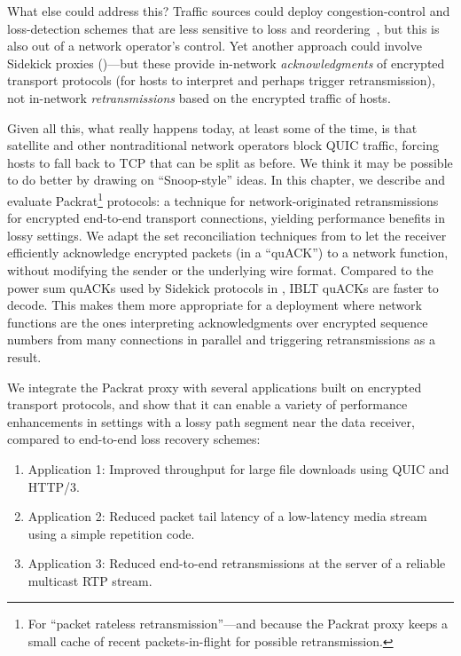 What else could address this? Traffic sources could deploy
congestion-control and loss-detection schemes that are less sensitive
to loss and reordering~\cite{rfc8985}, but this is also out of a
network operator's control. Yet another approach could involve
Sidekick proxies ()---but these provide
in-network \emph{acknowledgments} of encrypted transport protocols
(for hosts to interpret and perhaps trigger retransmission), not
in-network \emph{retransmissions} based on the encrypted traffic of
hosts.

Given all this, what really happens today, at least some
of the time, is that satellite and other nontraditional network
operators block QUIC traffic, forcing hosts to fall back to TCP that
can be split as before. We think it may be possible to do better by drawing on ``Snoop-style''
ideas. In this chapter, we describe and evaluate Packrat\footnote{For
``packet rateless retransmission''---and because the Packrat proxy keeps
a small cache of recent packets-in-flight for possible retransmission.}
protocols: a technique for network-originated retransmissions for encrypted
end-to-end transport connections, yielding performance benefits in lossy
settings. We adapt the set reconciliation techniques from  to
let the receiver efficiently acknowledge encrypted packets (in a ``quACK'') to
a network function, without modifying the sender or the underlying wire format.
Compared to the power sum quACKs used by Sidekick protocols
in , IBLT quACKs are faster to decode. This makes them more
appropriate for a deployment where network functions are the ones interpreting
acknowledgments over encrypted sequence numbers from many connections in
parallel and triggering retransmissions as a result.

We integrate the Packrat proxy with several applications built on encrypted
transport protocols, and show that it can enable a variety of performance
enhancements in settings with a lossy path segment near the data receiver,
compared to end-to-end loss recovery schemes:

\begin{enumerate}[noitemsep]
\item Application 1: Improved throughput for large file downloads using QUIC and HTTP/3.
\item Application 2: Reduced packet tail latency of a low-latency media stream using a simple repetition code.
\item Application 3: Reduced end-to-end retransmissions at the server of a reliable multicast RTP stream.
\end{enumerate}

